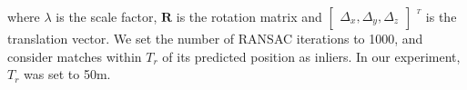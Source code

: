 \begin{enumerate}
where $\lambda$ is the scale factor, $\mathbf{R}$ is the rotation matrix and $\left [ \begin{array}{c}
    \Delta_x, \Delta_y, \Delta_z
\end{array}
\right ]$ $^{^T}$ is the translation vector.
We set the number of RANSAC iterations to 1000, and consider matches within $T_r$ of its predicted position as inliers. In our experiment, {$T_r$ was set to 50m.}
\end{enumerate}

\begin{figure}[htbp]
    \begin{center}
\end{center}
\end{figure}
